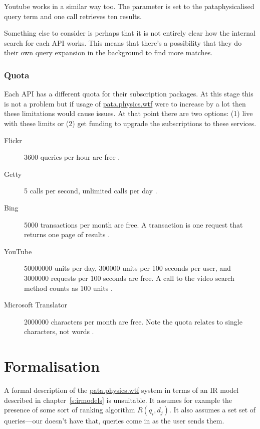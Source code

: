 Youtube works in a similar way too. The  parameter is set to the pataphysicalised query term and one call retrieves ten results.

Something else to consider is perhaps that it is not entirely clear how the internal search for each \ac{API} works. This means that there's a possibility that they do their own query expansion in the background to find more matches.


\subsubsection{Quota}
\label{s:quota}

Each \ac{API} has a different quota for their subscription packages. At this stage this is not a problem but if usage of \url{pata.physics.wtf} were to increase by a lot then these limitations would cause issues. At that point there are two options: (1) live with these limits or (2) get funding to upgrade the subscriptions to these services.

\begin{description}
  \item[Flickr] \num{3600} queries per hour are free \autocite{FlickrGuideAPI}.
  \item[Getty] \num{5} calls per second, unlimited calls per day \autocite{GettyOverviewAPI}.
  \item[Bing] \num{5000} transactions per month are free. A transaction is one request that returns one page of results \autocite{BingAzureAPI}.
  \item[YouTube] \num{50000000} units per day, \num{300000} units per \num{100} seconds per user, and \num{3000000} requests per \num{100} seconds are free. A call to the video search method counts as \num{100} units \autocite{YouTubeAPI}.
  \item[Microsoft Translator] \num{2000000} characters per month are free. Note the quota relates to single characters, not words \autocite{TranslatorAPI}.
\end{description}


\section{Formalisation}

A formal description of the \url{pata.physics.wtf} system in terms of an \ac{IR} model described in chapter~\ref{s:irmodels} is unsuitable. It assumes for example the presence of some sort of ranking algorithm $R(q_i, d_j)$. It also assumes a set set of queries---our doesn't have that, queries come in as the user sends them.


